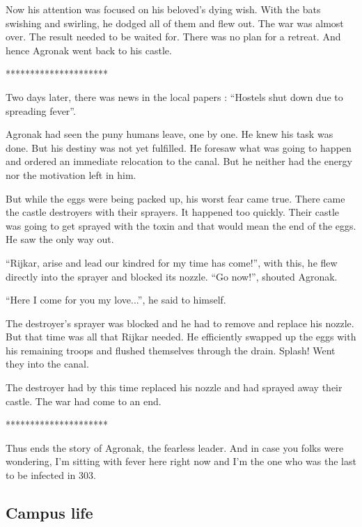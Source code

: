 \documentclass[twoside,11pt,titlepage]{article}
\begin{document}
Now his attention was focused on his beloved's dying wish. With the bats swishing and swirling, he dodged all of them and flew out. The war was almost over. The result needed to be waited for. There was no plan for a retreat. And hence Agronak went back to his castle.

\bigskip
\begin{center}
*********************
\end{center}


Two days later, there was news in the local papers : ``Hostels shut down due to spreading fever''.

Agronak had seen the puny humans leave, one by one. He knew his task was done. But his destiny was not yet fulfilled. He foresaw what was going to happen and ordered an immediate relocation to the canal. But he neither had the energy nor the motivation left in him.

But while the eggs were being packed up, his worst fear came true. There came the castle destroyers with their sprayers. It happened too quickly. Their castle was going to get sprayed with the toxin and that would mean the end of the eggs. He saw the only way out.

``Rijkar, arise and lead our kindred for my time has come!'', with this, he flew directly into the sprayer and blocked its nozzle. ``Go now!'', shouted Agronak.

``Here I come for you my love...'', he said to himself.

The destroyer's sprayer was blocked and he had to remove and replace his nozzle. But that time was all that Rijkar needed. He efficiently swapped up the eggs with his remaining troops and flushed themselves through the drain. Splash! Went they into the canal.

The destroyer had by this time replaced his nozzle and had sprayed away their castle. The war had come to an end.

\bigskip
\begin{center}
*********************
\end{center}


Thus ends the story of Agronak, the fearless leader. And in case you folks were wondering, I'm sitting with fever here right now and I'm the one who was the last to be infected in 303.

\newpage
\begin{center}
  \section{Campus life}
\end{center}
\bigskip
\bigskip
\bigskip
\end{document}
